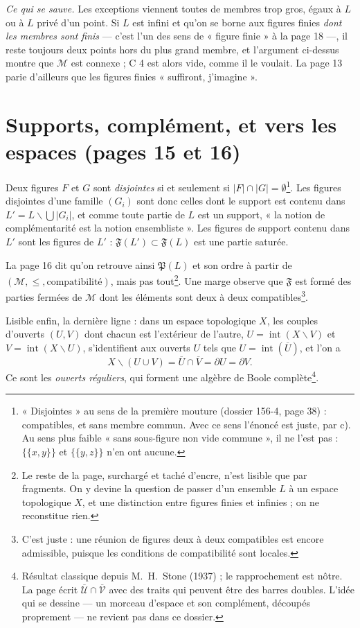 \documentclass[11pt,a4paper]{article}
\begin{document}
\emph{Ce qui se sauve.} Les exceptions viennent toutes de membres trop gros,
égaux à $L$ ou à $L$ privé d'un point. Si $L$ est infini et qu'on se borne aux
figures finies \emph{dont les membres sont finis} --- c'est l'un des sens de
« figure finie » à la page 18 ---, il reste toujours deux points hors du plus
grand membre, et l'argument ci-dessus montre que $\mathcal{M}$ est connexe ; C 4
est alors vide, comme il le voulait. La page 13 parie d'ailleurs que les figures
finies « suffiront, j'imagine ».

\section*{Supports, complément, et vers les espaces (pages 15 et 16)}

Deux figures $F$ et $G$ sont \emph{disjointes} si et seulement si $|F| \cap |G|
= \emptyset$\footnote{« Disjointes » au sens de la première mouture (dossier
156-4, page 38) : compatibles, et sans membre commun. Avec ce sens l'énoncé est
juste, par c). Au sens plus faible « sans sous-figure non vide commune », il ne
l'est pas : $\{\{x, y\}\}$ et $\{\{y, z\}\}$ n'en ont aucune.}. Les figures
disjointes d'une famille $(G_{i})$ sont donc celles dont le support est contenu
dans $L' = L \smallsetminus \bigcup |G_{i}|$, et comme toute partie de $L$ est
un support, « la notion de complémentarité est la notion ensembliste ». Les
figures de support contenu dans $L'$ sont les figures de $L'$ :
$\mathfrak{F}(L') \subset \mathfrak{F}(L)$ est une partie saturée.

La page 16 dit qu'on retrouve ainsi $\mathfrak{P}(L)$ et son ordre à partir de
$(\mathcal{M}, \leq, \text{compatibilité})$, mais pas tout\footnote{Le reste
de la page, surchargé et taché d'encre, n'est lisible que par fragments. On y
devine la question de passer d'un ensemble $L$ à un espace topologique $X$, et
une distinction entre figures finies et infinies ; on ne reconstitue rien.}.
Une marge observe que $\mathfrak{F}$ est formé des parties fermées de
$\mathcal{M}$ dont les éléments sont deux à deux compatibles\footnote{C'est
juste : une réunion de figures deux à deux compatibles est encore admissible,
puisque les conditions de compatibilité sont locales.}.

Lisible enfin, la dernière ligne : dans un espace topologique $X$, les couples
d'ouverts $(U, V)$ dont chacun est l'extérieur de l'autre, $U =
\operatorname{int}(X \smallsetminus V)$ et $V = \operatorname{int}(X
\smallsetminus U)$, s'identifient aux ouverts $U$ tels que $U =
\operatorname{int}(\overline{U})$, et l'on a
\[
X \smallsetminus (U \cup V) = \overline{U} \cap \overline{V} = \partial U =
\partial V .
\]
Ce sont les \emph{ouverts réguliers}, qui forment une algèbre de Boole
complète\footnote{Résultat classique depuis M.~H.~Stone (1937) ; le
rapprochement est nôtre. La page écrit $\overline{\mathcal{U}} \cap
\overline{\mathcal{V}}$ avec des traits qui peuvent être des barres doubles.
L'idée qui se dessine --- un morceau d'espace et son complément, découpés
proprement --- ne revient pas dans ce dossier.}.
\end{document}
